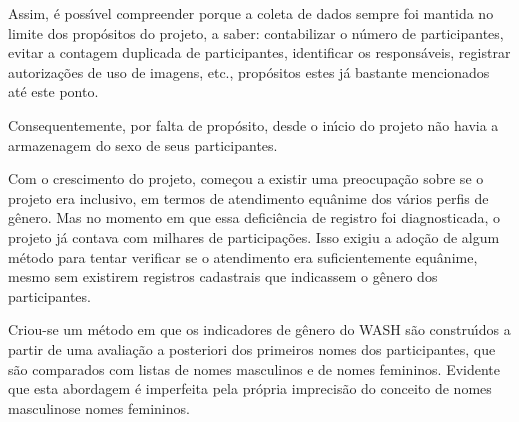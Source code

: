 \documentclass[
12pt,		%
openright,	%
twoside,  %
a4paper,			%
chapter=TITLE,		%
english,			%
french,				%
spanish,			%
brazil				%
]{USPSC-classe/USPSC}
\begin{document}
Assim, \'e poss\'{\i}vel compreender porque a coleta de dados sempre foi mantida no limite dos prop\'ositos do projeto, a saber: contabilizar o n\'umero de participantes, evitar a contagem duplicada de participantes, identificar os respons\'aveis, registrar autoriza\c{c}\~oes de uso de imagens, etc., prop\'ositos estes j\'a bastante mencionados at\'e este ponto.














Consequentemente, por falta de prop\'osito, desde o in\'{\i}cio do projeto n\~ao havia a armazenagem do sexo de seus participantes.














Com o crescimento do projeto, come\c{c}ou a existir uma preocupa\c{c}\~ao sobre se o projeto era inclusivo, em termos de atendimento equ\^anime dos v\'arios perfis de g\^enero. Mas no momento em que essa defici\^encia de registro foi diagnosticada, o projeto j\'a contava com milhares de participa\c{c}\~oes. Isso exigiu a ado\c{c}\~ao de algum m\'etodo para tentar verificar se o atendimento era suficientemente equ\^anime, mesmo sem existirem registros cadastrais que indicassem o g\^enero dos participantes.














Criou-se um m\'etodo em que os indicadores de g\^enero do WASH s\~ao constru\'{\i}dos a partir de uma avalia\c{c}\~ao a posteriori dos primeiros nomes dos participantes, que s\~ao comparados com listas de nomes masculinos e de nomes femininos. Evidente que esta abordagem \'e imperfeita pela pr\'opria imprecis\~ao do conceito de \textquotedbl nomes masculinos\textquotedbl  e \textquotedbl nomes femininos\textquotedbl .
\end{document}
